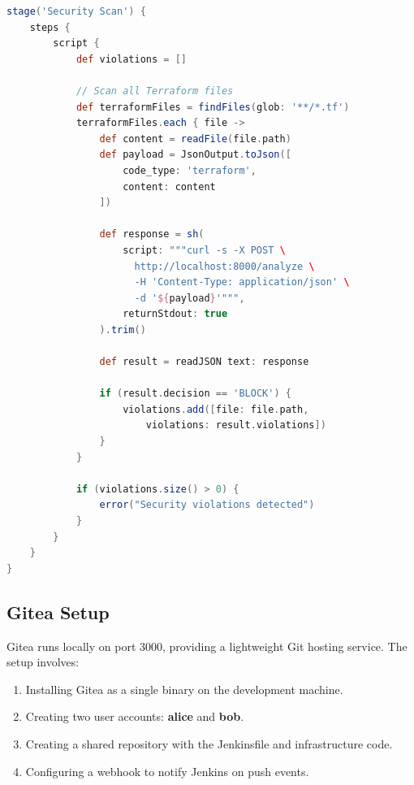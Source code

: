 \begin{lstlisting}[language=Groovy, caption={Jenkinsfile — security scan stage (simplified)}, label={lst:jenkinsfile}]
stage('Security Scan') {
    steps {
        script {
            def violations = []
            
            // Scan all Terraform files
            def terraformFiles = findFiles(glob: '**/*.tf')
            terraformFiles.each { file ->
                def content = readFile(file.path)
                def payload = JsonOutput.toJson([
                    code_type: 'terraform',
                    content: content
                ])
                
                def response = sh(
                    script: """curl -s -X POST \
                      http://localhost:8000/analyze \
                      -H 'Content-Type: application/json' \
                      -d '${payload}'""",
                    returnStdout: true
                ).trim()
                
                def result = readJSON text: response
                
                if (result.decision == 'BLOCK') {
                    violations.add([file: file.path, 
                        violations: result.violations])
                }
            }
            
            if (violations.size() > 0) {
                error("Security violations detected")
            }
        }
    }
}
\end{lstlisting}

\subsection{Gitea Setup}

Gitea runs locally on port 3000, providing a lightweight Git hosting service. The setup involves:

\begin{enumerate}
    \item Installing Gitea as a single binary on the development machine.
    \item Creating two user accounts: \textbf{alice} and \textbf{bob}.
    \item Creating a shared repository with the Jenkinsfile and infrastructure code.
    \item Configuring a webhook to notify Jenkins on push events.
\end{enumerate}

